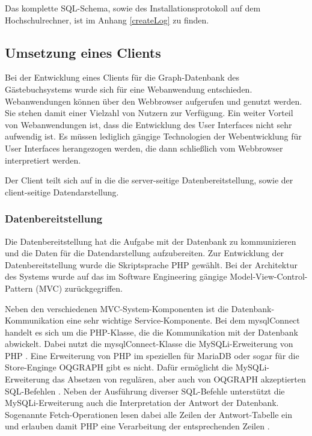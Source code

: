 Das komplette SQL-Schema, sowie des Installationsprotokoll auf dem Hochschulrechner, ist im Anhang \ref{createLog} zu finden.

\subsection{Umsetzung eines Clients}
Bei der Entwicklung eines Clients für die Graph-Datenbank des Gästebuchsystems wurde sich für eine Webanwendung entschieden. Webanwendungen können über den Webbrowser aufgerufen und genutzt werden. Sie stehen damit einer Vielzahl von Nutzern zur Verfügung. Ein weiter Vorteil von Webanwendungen ist, dass die Entwicklung des User Interfaces nicht sehr aufwendig ist. Es müssen lediglich gängige Technologien der Webentwicklung für User Interfaces herangezogen werden, die dann schließlich vom Webbrowser interpretiert werden.

Der Client teilt sich auf in die die server-seitige Datenbereitstellung, sowie der client-seitige Datendarstellung.

\subsubsection{Datenbereitstellung}
Die Datenbereitstellung hat die Aufgabe mit der Datenbank zu kommunizieren und die Daten für die Datendarstellung aufzubereiten. Zur Entwicklung der Datenbereitstellung wurde die Skriptsprache PHP gewählt. Bei der Architektur des Systems wurde auf das im Software Engineering gängige Model-View-Control-Pattern (MVC) zurückgegriffen.

Neben den verschiedenen MVC-System-Komponenten ist die Datenbank-Kommunikation eine sehr wichtige Service-Komponente. Bei dem \grqq mysqlConnect\grqq{} handelt es sich um die PHP-Klasse, die die Kommunikation mit der Datenbank abwickelt. Dabei nutzt die mysqlConnect-Klasse die MySQLi-Erweiterung von PHP \cite{PHP-Mysqli}. Eine Erweiterung von PHP im speziellen für MariaDB oder sogar für die Store-Enginge OQGRAPH gibt es nicht. Dafür ermöglicht die MySQLi-Erweiterung das Absetzen von regulären, aber auch von OQGRAPH akzeptierten SQL-Befehlen \cite{PHP-Mysqli-Query}. Neben der Ausführung diverser SQL-Befehle unterstützt die MySQLi-Erweiterung auch die Interpretation der Antwort der Datenbank. Sogenannte Fetch-Operationen lesen dabei alle Zeilen der Antwort-Tabelle ein und erlauben damit PHP eine Verarbeitung der entsprechenden Zeilen \cite{PHP-Mysqli-Fetch}.

